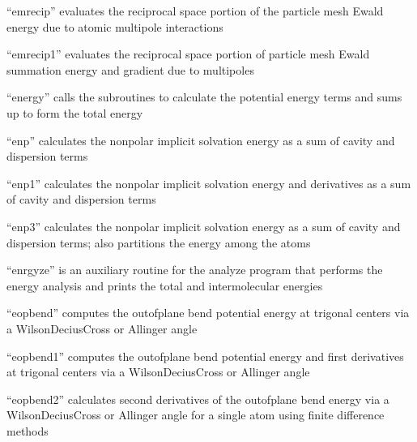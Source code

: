 \documentclass[letterpaper,11pt,english]{sphinxmanual}
\begin{document}

“emrecip” evaluates the reciprocal space portion of the particle
mesh Ewald energy due to atomic multipole interactions


“emrecip1” evaluates the reciprocal space portion of particle
mesh Ewald summation energy and gradient due to multipoles


“energy” calls the subroutines to calculate the potential
energy terms and sums up to form the total energy


“enp” calculates the nonpolar implicit solvation energy
as a sum of cavity and dispersion terms


“enp1” calculates the nonpolar implicit solvation energy
and derivatives as a sum of cavity and dispersion terms


“enp3” calculates the nonpolar implicit solvation energy as
a sum of cavity and dispersion terms; also partitions the
energy among the atoms


“enrgyze” is an auxiliary routine for the analyze program
that performs the energy analysis and prints the total and
intermolecular energies


“eopbend” computes the out\sphinxhyphen{}of\sphinxhyphen{}plane bend potential energy at
trigonal centers via a Wilson\sphinxhyphen{}Decius\sphinxhyphen{}Cross or Allinger angle


“eopbend1” computes the out\sphinxhyphen{}of\sphinxhyphen{}plane bend potential energy and
first derivatives at trigonal centers via a Wilson\sphinxhyphen{}Decius\sphinxhyphen{}Cross
or Allinger angle


“eopbend2” calculates second derivatives of the out\sphinxhyphen{}of\sphinxhyphen{}plane
bend energy via a Wilson\sphinxhyphen{}Decius\sphinxhyphen{}Cross or Allinger angle for
a single atom using finite difference methods
\end{document}
